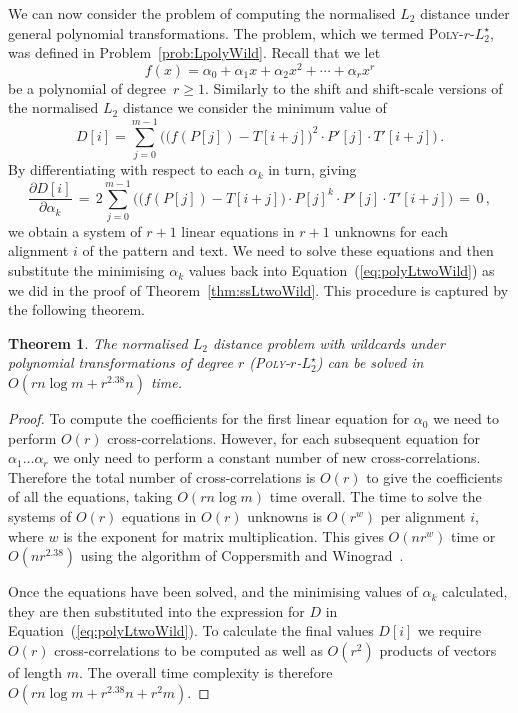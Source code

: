 \documentclass[11pt]{article}
\renewcommand{\geq}{\geqslant}
\newcommand{\wildcard}{\ensuremath{\star}\xspace}
\newcommand{\LpolyWild}{\textsc{Poly-$r$-$L_2^\wildcard$}\xspace}
\theoremstyle{plain}
\newtheorem{theorem}{Theorem}[]
\theoremstyle{definition}
\begin{document}
We can now consider the problem of computing the normalised $L_2$ distance under general polynomial transformations. The problem, which we termed \LpolyWild, was defined in Problem~\ref{prob:LpolyWild}. Recall that we let
\begin{equation*}
    f(x)=\alpha_0 + \alpha_1 x + \alpha_2 x^2 + \cdots + \alpha_r x^r
\end{equation*}
be a polynomial of degree~$r\geq 1$.
Similarly to the shift and shift-scale versions of the normalised $L_2$ distance we consider the minimum value of
\begin{equation}
    \label{eq:polyLtwoWild}
    D[i] = \sum_{j=0}^{m-1} \Big( \big(f(P[j]) - T[i+j]\big)^2 \cdot P'[j]\cdot T'[i+j] \Big) \,.
\end{equation}
By differentiating with respect to each $\alpha_{k}$ in turn, giving
\begin{equation*}
    \frac{\partial D[i]}{\partial \alpha_k} \,=\, 2 \sum_{j=0}^{m-1} \Big( \big( f(P[j])  - T[i+j] \big) \cdot P[j]^k \cdot P'[j] \cdot T'[i+j] \Big) \,=\, 0 \,,
\end{equation*}
we obtain a system of $r+1$ linear equations in $r+1$ unknowns for each alignment $i$ of the pattern and text. We need to solve these equations and then substitute the minimising $\alpha_k$ values back into Equation~(\ref{eq:polyLtwoWild}) as we did in the proof of Theorem~\ref{thm:ssLtwoWild}. This procedure is captured by the following theorem.

\begin{theorem}
    The normalised $L_2$ distance problem with wildcards under polynomial transformations of degree $r$ (\LpolyWild) can be solved in  $O(rn\log{m} +   r^{2.38}n)$ time.
\end{theorem}
\begin{proof}
    To compute the coefficients for the first linear equation for $\alpha_0$ we need to perform $O(r)$ cross-correlations.  However, for each subsequent equation for $\alpha_1 \ldots \alpha_r$ we only need to perform a constant number of new cross-correlations.  Therefore the total number of cross-correlations is $O(r)$ to give the coefficients of all the equations, taking $O(r n\log{m})$ time overall.  The time to solve the systems of $O(r)$ equations in $O(r)$ unknowns is $O(r^w)$ per alignment $i$, where $w$ is the exponent for matrix multiplication.  This gives $O(nr^w)$ time or $O(nr^{2.38})$ using the algorithm of Coppersmith and Winograd~\cite{CW:1990}.

    Once the equations have been solved, and the minimising values of $\alpha_k$ calculated, they are then substituted into the expression for $D$ in Equation~(\ref{eq:polyLtwoWild}).   To calculate the final values $D[i]$ we require $O(r)$ cross-correlations to be computed as well as $O(r^2)$ products of vectors of length $m$.  The overall time complexity is therefore $O(rn\log{m} +   r^{2.38}n + r^2 m)$.
\end{proof}
\end{document}
